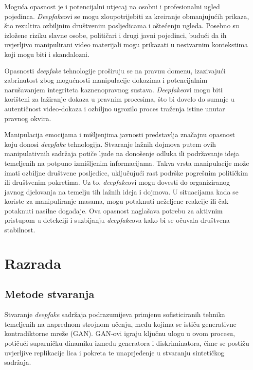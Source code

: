 \documentclass[seminarski, times, utf8]{fer}
\begin{document}
Moguća opasnost je i potencijalni utjecaj na osobni i profesionalni ugled pojedinca. \textit{Deepfake}ovi se mogu zloupotrijebiti za kreiranje obmanjujućih prikaza, što rezultira ozbiljnim društvenim posljedicama i oštećenju ugleda. Posebno su izložene riziku slavne osobe, političari i drugi javni pojedinci, budući da ih uvjerljivo manipulirani video materijali mogu prikazati u nestvarnim kontekstima koji mogu biti i skandalozni.

Opasnosti \textit{deepfake} tehnologije proširuju se na pravnu domenu, izazivajući zabrinutost zbog mogućnosti manipulacije dokazima i potencijalnim narušavanjem integriteta kaznenopravnog sustava. \textit{Deepfake}ovi mogu biti korišteni za lažiranje dokaza u pravnim procesima, što bi dovelo do sumnje u autentičnost video-dokaza i ozbiljno ugrozilo proces traženja istine unutar pravnog okvira.

Manipulacija emocijama i mišljenjima javnosti predstavlja značajnu opasnost koju donosi \textit{deepfake} tehnologija. Stvaranje lažnih dojmova putem ovih manipulativnih sadržaja potiče ljude na donošenje odluka ili podržavanje ideja temeljenih na potpuno izmišljenim informacijama. Takva vrsta manipulacije može imati ozbiljne društvene posljedice, uključujući rast podrške pogrešnim političkim ili društvenim pokretima. Uz to, \textit{deepfake}ovi mogu dovesti do organiziranog javnog djelovanja na temelju tih lažnih ideja i dojmova. U situacijama kada se koriste za manipuliranje masama, mogu potaknuti neželjene reakcije ili čak potaknuti nasilne događaje. Ova opasnost naglašava potrebu za aktivnim pristupom u detekciji i suzbijanju \textit{deepfake}ova kako bi se očuvala društvena stabilnost.


\chapter{Razrada}
\section{Metode stvaranja}
Stvaranje \textit{deepfake} sadržaja podrazumijeva primjenu sofisticiranih tehnika temeljenih na naprednom strojnom učenju, među kojima se ističu generativne kontradiktorne mreže (GAN). GAN-ovi igraju ključnu ulogu u ovom procesu, potičući suparničku dinamiku između generatora i diskriminatora, čime se postižu uvjerljive replikacije lica i pokreta te unaprjeđenje u stvaranju sintetičkog sadržaja.
\end{document}
